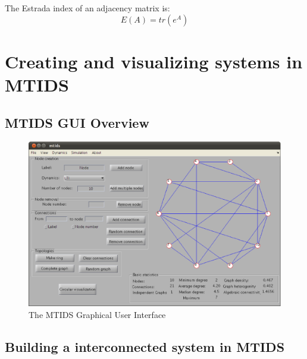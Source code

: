 \documentclass[a4paper,twoside, openright,12pt]{report}
\begin{document}
The Estrada index of an adjacency matrix is:
\begin{equation}
E(A) = tr(e^{A})
\end{equation} 


\pagebreak 
\section{Creating and visualizing systems in MTIDS}
\subsection{MTIDS GUI Overview}
\begin{figure}[h!]
 \centering
 \includegraphics[width= \textwidth]{./pics/Mtits_UI.eps}
 \caption{The MTIDS Graphical User Interface}
 \label{fig:MTIDS-UI}
\end{figure}



\subsection{Building a interconnected system in MTIDS}
\end{document}
